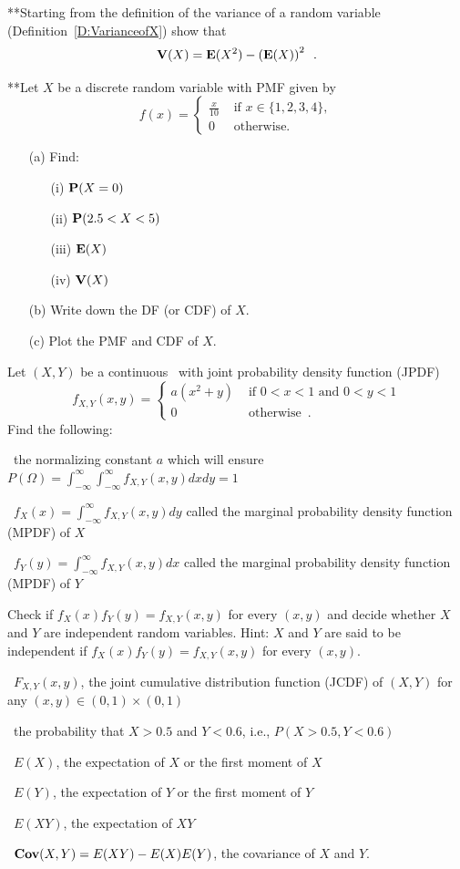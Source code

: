 \begin{ExerciseList}
\ee

\Exercise
{**}Starting from the definition of the variance of a random variable (Definition~\ref{D:VarianceofX}) show that
\[\mathbf{V}(X) = \mathbf{E}(X^2) - \left(\mathbf{E}(X)\right)^2 \enspace .\]

\Exercise
{**}Let $X$ be a discrete random variable with PMF given by
\[
f(x) = 
\begin{cases}
\frac{x}{10} & \text{ if } x \in \{1,2,3,4\} ,\\
0 & \text{ otherwise.}
\end{cases}
\]
\begin{itemize}
\item[(a)] Find:
\begin{itemize}
\item[(i)] $\mathbf{P}(X=0)$
\item[(ii)] $\mathbf{P}(2.5 < X < 5)$
\item[(iii)] $\mathbf{E}(X)$
\item[(iv)] $\mathbf{V}(X)$
\end{itemize}
\item[(b)] Write down the DF (or CDF) of $X$.
\item[(c)] Plot the PMF and CDF of $X$.
\end{itemize}

\Exercise
Let $(X,Y)$ be a continuous \rv~with joint probability density function (JPDF)
\[
f_{X,Y}(x,y)
=
\begin{cases}
a (x^2+y) & \text{ if } 0 < x < 1 \text{ and } 0 < y < 1\\
0 & \text{ otherwise} \enspace .
\end{cases}
\]
Find the following:
\be
\item~the normalizing constant $a$ which will ensure $P(\Omega) = \int_{-\infty}^{\infty}\int_{-\infty}^{\infty} f_{X,Y}(x,y) dx dy = 1$
\item~$f_X(x) = \int_{-\infty}^{\infty} f_{X,Y}(x,y) dy$ called the marginal probability density function (MPDF) of $X$
\item~$f_Y(y) = \int_{-\infty}^{\infty} f_{X,Y}(x,y) dx$ called the marginal probability density function (MPDF) of $Y$
\item Check if $f_X(x)f_Y(y)=f_{X,Y}(x,y)$ for every $(x,y)$ and decide whether $X$ and $Y$ are independent random variables.  {Hint: $X$ and $Y$ are said to be independent if $f_X(x)f_Y(y)=f_{X,Y}(x,y)$ for every $(x,y)$.}
\item~$F_{X,Y}(x,y)$, the joint cumulative distribution function (JCDF) of $(X,Y)$ for any $(x,y) \in (0,1) \times (0,1)$ 
\item~the probability that $X > 0.5$ and $Y<0.6$, i.e., $P(X>0.5,Y<0.6)$
\item~$E(X)$, the expectation of $X$ or the first moment of $X$
\item~$E(Y)$, the expectation of $Y$ or the first moment of $Y$
\item~$E(XY)$, the expectation of $XY$
\item~$\mathbf{Cov}(X,Y)=E(XY)-E(X)E(Y)$, the covariance of $X$ and $Y$.
\ee


\end{ExerciseList}
